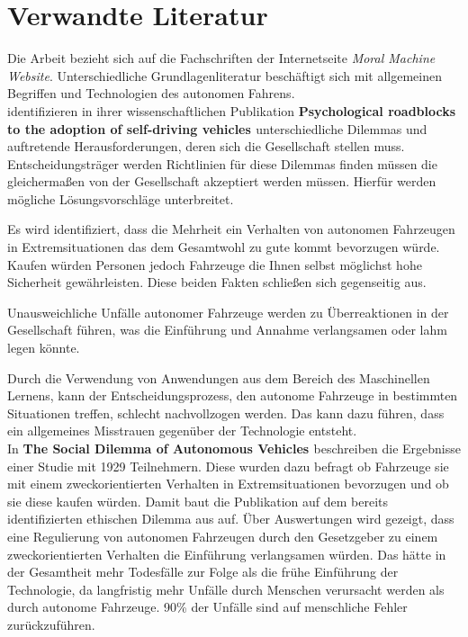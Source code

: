 \section{Verwandte Literatur}
\label{sec:verwandte-literatur}

Die Arbeit bezieht sich auf die Fachschriften der Internetseite \textit{Moral Machine Website}. Unterschiedliche Grundlagenliteratur beschäftigt sich mit allgemeinen Begriffen und Technologien des autonomen Fahrens.\\

\citeauthor{roadblocks} identifizieren in ihrer wissenschaftlichen Publikation \textbf{Psychological roadblocks to the adoption of self-driving vehicles \cite{roadblocks}} unterschiedliche Dilemmas und auftretende Herausforderungen, deren sich die Gesellschaft stellen muss. Entscheidungsträger werden Richtlinien für diese Dilemmas finden müssen die gleichermaßen von der Gesellschaft akzeptiert werden müssen. Hierfür werden mögliche Lösungsvorschläge unterbreitet. 

Es wird identifiziert, dass die Mehrheit ein Verhalten von autonomen Fahrzeugen in Extremsituationen das dem Gesamtwohl zu gute kommt bevorzugen würde. Kaufen würden Personen jedoch Fahrzeuge die Ihnen selbst möglichst hohe Sicherheit gewährleisten. Diese beiden Fakten schließen sich gegenseitig aus.

Unausweichliche Unfälle autonomer Fahrzeuge werden zu Überreaktionen in der Gesellschaft führen, was die Einführung und Annahme verlangsamen oder lahm legen könnte.

Durch die Verwendung von Anwendungen aus dem Bereich des Maschinellen Lernens, kann der Entscheidungsprozess, den autonome Fahrzeuge in bestimmten Situationen treffen, schlecht nachvollzogen werden. Das kann dazu führen, dass ein allgemeines Misstrauen gegenüber der Technologie entsteht.\\

In \textbf{The Social Dilemma of Autonomous Vehicles \cite{socialDilemma}} beschreiben \citeauthor{socialDilemma} die Ergebnisse einer Studie mit 1929 Teilnehmern. Diese wurden dazu befragt ob Fahrzeuge sie mit einem zweckorientierten Verhalten in Extremsituationen bevorzugen und ob sie diese kaufen würden. Damit baut die Publikation auf dem bereits identifizierten ethischen Dilemma aus \cite{roadblocks} auf. Über Auswertungen wird gezeigt, dass eine Regulierung von autonomen Fahrzeugen durch den Gesetzgeber zu einem zweckorientierten Verhalten die Einführung verlangsamen würden. Das hätte in der Gesamtheit mehr Todesfälle zur Folge als die frühe Einführung der Technologie, da langfristig mehr Unfälle durch Menschen verursacht werden als durch autonome Fahrzeuge. 90\% der Unfälle sind auf menschliche Fehler zurückzuführen.\\

